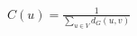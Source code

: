 \documentclass[12pt]{article}
\begin{document}
$C(u) = \frac{1}{\sum_{u \in V}{d_G\left(u,v\right)}} $
\end{document}
